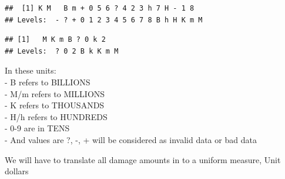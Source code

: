 \documentclass[]{article}
\newenvironment{Shaded}{\begin{snugshade}}{\end{snugshade}}
\newcommand{\KeywordTok}[1]{\textcolor[rgb]{0.13,0.29,0.53}{\textbf{{#1}}}}
\newcommand{\NormalTok}[1]{{#1}}
\begin{document}
\begin{Shaded}
\end{Shaded}

\begin{verbatim}
##  [1] K M   B m + 0 5 6 ? 4 2 3 h 7 H - 1 8
## Levels:  - ? + 0 1 2 3 4 5 6 7 8 B h H K m M
\end{verbatim}

\begin{Shaded}
\end{Shaded}

\begin{verbatim}
## [1]   M K m B ? 0 k 2
## Levels:  ? 0 2 B k K m M
\end{verbatim}

In these units:\\
- B refers to BILLIONS\\
- M/m refers to MILLIONS\\
- K refers to THOUSANDS\\
- H/h refers to HUNDREDS\\
- 0-9 are in TENS\\
- And values are ?, -, + will be considered as invalid data or bad data

We will have to translate all damage amounts in to a uniform measure,
Unit dollars
\end{document}
